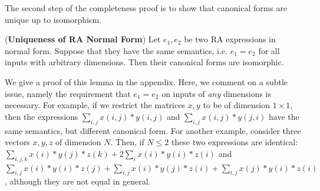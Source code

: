 
The second step of the completeness proof is to show that canonical
forms are unique up to isomorphism.


\begin{lemma} \label{lemma:unique:nf} (\textbf{Uniqueness of RA Normal
    Form}) Let $e_1, e_2$ be two RA expressions in normal form.
  Suppose that they have the same semantics, i.e. $e_1=e_2$ for all
  inputs with arbitrary dimensions.  Then their canonical forms are
  isomorphic.
\end{lemma}

We give a proof of this lemma in the appendix.
Here, we comment on a subtle issue, namely the requirement that
$e_1=e_2$ on inputs of {\em any} dimensions is necessary.  For
example, if we restrict the matrices $x, y$ to be of dimension
$1 \times 1$, then the expressions $\sum_{i,j} x(i,j)*y(i,j)$ and
$\sum_{i,j} x(i,j)*y(j,i)$ have the same semantics, but different
canonical form.  For another example, consider three vectors $x,y,z$
of dimension $N$.  Then, if $N \leq 2$ these two expressions are
identical: $\sum_{i,j,k} x(i)*y(j)*z(k)+2\sum_i x(i)*y(i)*z(i)$ and
$\sum_{i,j}x(i)*y(i)*z(j)+\sum_{i,j}x(i)*y(j)*z(i)+\sum_{i,j}x(j)*y(i)*z(i)$,
although they are not equal in general.


